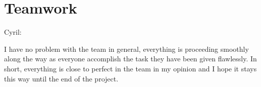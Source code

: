 \section{Teamwork}


Cyril:

I have no problem with the team in general, everything is proceeding smoothly along the way as everyone accomplish the task they have been given flawlessly. In short, everything is close to perfect in the team in my opinion and I hope it stays this way until the end of the project.